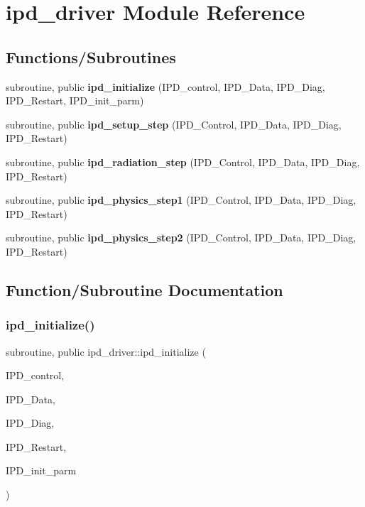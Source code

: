 \section{ipd\+\_\+driver Module Reference}
\label{namespaceipd__driver}
\subsection*{Functions/\+Subroutines}
\begin{DoxyCompactItemize}
\item 
subroutine, public \textbf{ ipd\+\_\+initialize} (I\+P\+D\+\_\+control, I\+P\+D\+\_\+\+Data, I\+P\+D\+\_\+\+Diag, I\+P\+D\+\_\+\+Restart, I\+P\+D\+\_\+init\+\_\+parm)
\item 
subroutine, public \textbf{ ipd\+\_\+setup\+\_\+step} (I\+P\+D\+\_\+\+Control, I\+P\+D\+\_\+\+Data, I\+P\+D\+\_\+\+Diag, I\+P\+D\+\_\+\+Restart)
\item 
subroutine, public \textbf{ ipd\+\_\+radiation\+\_\+step} (I\+P\+D\+\_\+\+Control, I\+P\+D\+\_\+\+Data, I\+P\+D\+\_\+\+Diag, I\+P\+D\+\_\+\+Restart)
\item 
subroutine, public \textbf{ ipd\+\_\+physics\+\_\+step1} (I\+P\+D\+\_\+\+Control, I\+P\+D\+\_\+\+Data, I\+P\+D\+\_\+\+Diag, I\+P\+D\+\_\+\+Restart)
\item 
subroutine, public \textbf{ ipd\+\_\+physics\+\_\+step2} (I\+P\+D\+\_\+\+Control, I\+P\+D\+\_\+\+Data, I\+P\+D\+\_\+\+Diag, I\+P\+D\+\_\+\+Restart)
\end{DoxyCompactItemize}


\subsection{Function/\+Subroutine Documentation}
\mbox{\label{namespaceipd__driver_afbc6aeb303c31ea8a9fdd3458dda5238}} 
\subsubsection{ipd\+\_\+initialize()}
{\footnotesize\ttfamily subroutine, public ipd\+\_\+driver\+::ipd\+\_\+initialize (\begin{DoxyParamCaption}\item[{type(ipd\+\_\+control\+\_\+type), intent(inout)}]{I\+P\+D\+\_\+control,  }\item[{type(ipd\+\_\+data\+\_\+type), dimension(\+:), intent(inout)}]{I\+P\+D\+\_\+\+Data,  }\item[{type(ipd\+\_\+diag\+\_\+type), dimension(\+:), intent(inout)}]{I\+P\+D\+\_\+\+Diag,  }\item[{type(ipd\+\_\+restart\+\_\+type), intent(inout)}]{I\+P\+D\+\_\+\+Restart,  }\item[{type(ipd\+\_\+init\+\_\+type), intent(in)}]{I\+P\+D\+\_\+init\+\_\+parm }\end{DoxyParamCaption})}



